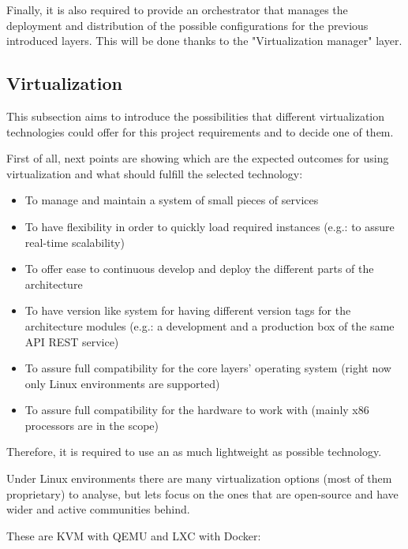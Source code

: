 Finally, it is also required to provide an orchestrator that manages the deployment and distribution of the possible configurations for the previous introduced layers. This will be done thanks to the "Virtualization manager" layer.

\subsection{Virtualization}

This subsection aims to introduce the possibilities that different virtualization technologies could offer for this project requirements and to decide one of them.

First of all, next points are showing which are the expected outcomes for using virtualization and what should fulfill the selected technology:

\begin{itemize}
\item To manage and maintain a system of small pieces of services
\item To have flexibility in order to quickly load required instances (e.g.: to assure real-time scalability)
\item To offer ease to continuous develop and deploy the different parts of the architecture
\item To have version like system for having different version tags for the architecture modules (e.g.: a development and a production box of the same API REST service)
\item To assure full compatibility for the core layers' operating system (right now only Linux environments are supported)
\item To assure full compatibility for the hardware to work with (mainly x86 processors are in the scope)
\end{itemize}

Therefore, it is required to use an as much lightweight as possible technology.

Under Linux environments there are many virtualization options (most of them proprietary) to analyse, but lets focus on the ones that are open-source and have wider and active communities behind.

These are KVM with QEMU and LXC with Docker:

